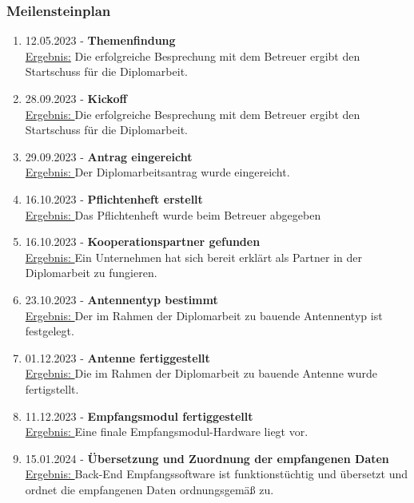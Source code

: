 \subsubsection{Meilensteinplan}

\begin{enumerate}
	\item 12.05.2023 - \textbf{Themenfindung}\\
	\underline{Ergebnis:} Die erfolgreiche Besprechung mit dem Betreuer ergibt den Startschuss für die 
	Diplomarbeit.
	
	\item 28.09.2023 - \textbf{Kickoff}\\
	\underline{Ergebnis: }Die erfolgreiche Besprechung mit dem Betreuer ergibt den Startschuss für die 
	Diplomarbeit.
	
	\item 29.09.2023 - \textbf{Antrag eingereicht}\\
	\underline{Ergebnis: }Der Diplomarbeitsantrag wurde eingereicht.
	
	\item 16.10.2023 - \textbf{Pflichtenheft erstellt}\\
	\underline{Ergebnis: }Das Pflichtenheft wurde beim Betreuer abgegeben 
	
	\item 16.10.2023 - \textbf{Kooperationspartner gefunden}\\
	\underline{Ergebnis: }Ein Unternehmen hat sich bereit erklärt als Partner in der Diplomarbeit zu fungieren. 
	
	\item 23.10.2023 - \textbf{Antennentyp bestimmt}\\
	\underline{Ergebnis: }Der im Rahmen der Diplomarbeit zu bauende Antennentyp ist festgelegt. 
	
	\item 01.12.2023 - \textbf{Antenne fertiggestellt}\\
	\underline{Ergebnis: }Die im Rahmen der Diplomarbeit zu bauende Antenne wurde fertigstellt.
	
	\item 11.12.2023 - \textbf{Empfangsmodul fertiggestellt}\\
	\underline{Ergebnis: }Eine finale Empfangsmodul-Hardware liegt vor. 
	
	\item 15.01.2024 - \textbf{Übersetzung und Zuordnung der empfangenen Daten}\\
	\underline{Ergebnis: }Back-End Empfangssoftware ist funktionstüchtig und übersetzt und ordnet die 
	empfangenen Daten ordnungsgemäß zu.
	

\end{enumerate}
